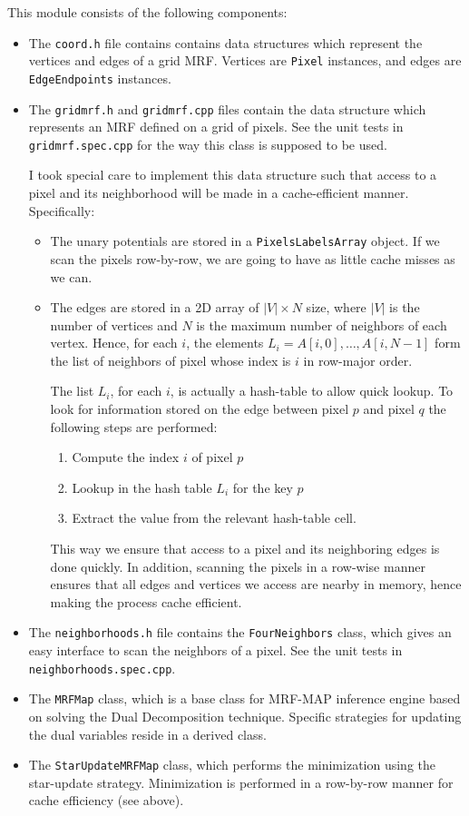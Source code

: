 \documentclass[12pt,a4paper]{article}
\begin{document}
This module consists of the following components:
\begin{itemize}
	\item The \texttt{coord.h} file contains contains data structures which represent the vertices and edges of a grid MRF. Vertices are \texttt{Pixel} instances, and edges are \texttt{EdgeEndpoints} instances.
	\item The \texttt{gridmrf.h} and \texttt{gridmrf.cpp} files contain the data structure which represents an MRF defined on a grid of pixels. See the unit tests in \texttt{gridmrf.spec.cpp} for the way this class is supposed to be used.
	
	I took special care to implement this data structure such that access to a pixel and its neighborhood will be made in a cache-efficient manner. Specifically:
	\begin{itemize}
		\item The unary potentials are stored in a \texttt{PixelsLabelsArray} object. If we scan the pixels row-by-row, we are going to have as little cache misses as we can.
		\item The edges are stored in a 2D array of $|V| \times N$ size, where $|V|$ is the number of vertices and $N$ is the maximum number of neighbors of each vertex. Hence, for each $i$, the elements $L_i = A[i,0], \dots, A[i,N-1]$ form the list of neighbors of pixel whose index is $i$ in row-major order. 
		
		The list $L_i$, for each $i$, is actually a hash-table to allow quick lookup. To look for information stored on the edge between pixel $p$ and pixel $q$ the following steps are performed:
		\begin{enumerate}
			\item Compute the index $i$ of pixel $p$
			\item Lookup in the hash table $L_i$ for the key $p$
			\item Extract the value from the relevant hash-table cell.
		\end{enumerate}
		
		This way we ensure that access to a pixel and its neighboring edges is done quickly. In addition, scanning the pixels in a row-wise manner ensures that all edges and vertices we access are nearby in memory, hence making the process cache efficient.
	\end{itemize}
	\item The \texttt{neighborhoods.h} file contains the \texttt{FourNeighbors} class, which gives an easy interface to scan the neighbors of a pixel. See the unit tests in \texttt{neighborhoods.spec.cpp}.
	\item The \texttt{MRFMap} class, which is a base class for MRF-MAP inference engine based on solving the Dual Decomposition technique. Specific strategies for updating the dual variables reside in a derived class.
	\item The \texttt{StarUpdateMRFMap} class, which performs the minimization using the star-update strategy. Minimization is performed in a row-by-row manner for cache efficiency (see above).
\end{itemize}
\end{document}
